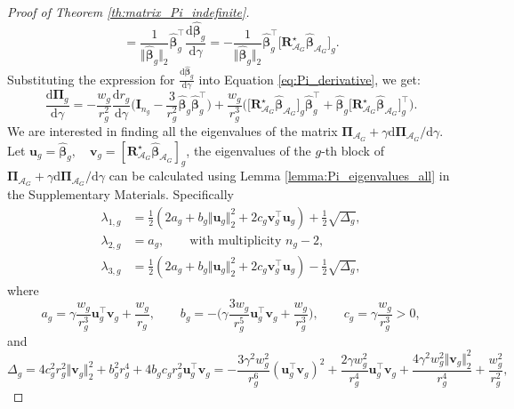 \documentclass[10pt,a4paper]{amsart}
\newcommand{\Aset}{\mathcal{A}}
\newcommand{\T}{\top}
\def\bI{\mathbf{I}}
\def\bPi{\boldsymbol{\Pi}}
\def\bR{\mathbf{R}}
\def\bbeta{\boldsymbol{\beta}}
\newcommand{\betahat}{\widehat{\boldsymbol\beta}}
\def\bu{\boldsymbol{u}}
\def\bv{\boldsymbol{v}}
\begin{document}
\begin{proof}[Proof of Theorem \ref{th:matrix_Pi_indefinite}]
\begin{equation}
= \frac{1}{\Vert \widehat{\bbeta}_{g} \Vert_2}\widehat{\bbeta}_{g}^{\T} \frac{\mathrm{d}\widehat{\bbeta}_{g}}{\mathrm{d}\gamma}=-\frac{1}{\Vert \widehat{\bbeta}_{g} \Vert_2}\widehat{\bbeta}_{g}^{\T} \Big[\bR_{\Aset_G}^\star\betahat_{\Aset_G}\Big]_g.%
\end{equation}
Substituting the expression for $\frac{\mathrm{d}\betahat_g}{\mathrm{d}\gamma}$ into Equation 
\eqref{eq:Pi_derivative}, we get:
\begin{equation}
\label{eq:Pi_derivative_final}
\frac{\mathrm{d}\bPi_{g}}{\mathrm{d}\gamma}
= -\frac{w_g}{r_g^2}\frac{\mathrm{d}r_g}{\mathrm{d}\gamma}\Big(\bI_{n_g}-\frac{3}{r_g^2} \widehat{\bbeta}_g \widehat{\bbeta}_g^{\T} \Big)+  \frac{w_g}{r_g^3} \Big(\Big[\bR_{\Aset_G}^\star\widehat{\bbeta}_{\Aset_G}\Big]_g \widehat{\bbeta}_g^{\T} + \widehat{\bbeta}_g \Big[\bR_{\Aset_G}^\star\widehat{\bbeta}_{\Aset_G}\Big]_g^{\T} \Big).
\end{equation}
We are interested in finding all the eigenvalues of the matrix $\bPi_{\Aset_G}+\gamma \mathrm{d}  \bPi_{\Aset_G}/\mathrm{d} \gamma$. Let $\bu_g = \widehat{\bbeta}_g,\quad \bv_g = \left[\bR_{\Aset_G}^\star \widehat{\bbeta}_{\Aset_G} \right]_g$, the eigenvalues of the $g$-th block of $\bPi_{\Aset_G}+\gamma \mathrm{d}  \bPi_{\Aset_G}/\mathrm{d} \gamma$ can be calculated using Lemma \ref{lemma:Pi_eigenvalues_all} in the Supplementary Materials. Specifically
\begin{align*}
\lambda_{1,g} &= \frac{1}{2}(2 a_g+b_g \Vert\bu_g\Vert_2^2+2 c_g \bv_g^{\T}\bu_g) + \frac{1}{2}\sqrt{\Delta_g}, \\
\lambda_{2,g} &= a_g, \qquad \text{with multiplicity } n_g - 2, \\
\lambda_{3,g} &= \frac{1}{2}(2 a_g+b_g \Vert\bu_g\Vert_2^2+2 c_g \bv_g^{\T}\bu_g) - \frac{1}{2}\sqrt{\Delta_g},
\end{align*}
where
\begin{equation}
\label{eq:abc_definition}
a_g=\gamma\frac{w_g}{r_g^3}\bu_g^{\T}\bv_g+\frac{w_g}{r_g},\qquad
b_g=-\Big(\gamma\frac{3w_g}{r_g^5}\bu_g^{\T}\bv_g+\frac{w_g}{r_g^3}\Big),\qquad
c_g=\gamma\frac{w_g}{r_g^3}>0,
\end{equation}
and
\begin{equation}
\label{eq:Pi_eigen_Delta}
\Delta_g=4c_g^2r_g^2\Vert\bv_g\Vert_2^2+b_g^2r_g^4+4b_gc_gr_g^2\bu_g^{\T}\bv_g=-\frac{3\gamma^2w_g^2}{r_g^6}(\bu_g^{\T}\bv_g)^2+\frac{2\gamma w_g^2}{r_g^4}\bu_g^{\T}\bv_g+\frac{4\gamma^2 w_g^2\Vert\bv_g\Vert_2^2}{r_g^4}+\frac{w_g^2}{r_g^2},
\end{equation}

\end{proof}
\end{document}
